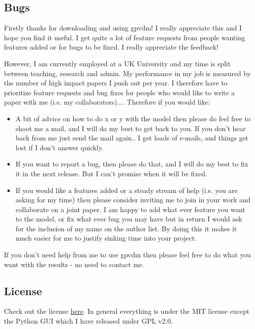 \subsection{Bugs}
Firstly thanks for downloading and using gpvdm! I really appreciate this and I hope you find it useful. I get quite a lot of feature requests from people wanting features added or for bugs to be fixed. I really appreciate the feedback!

However, I am currently employed at a UK University and my time is split between teaching, research and admin. My performance in my job is measured by the number of high impact papers I push out per year. I therefore have to prioritize feature requests and bug fixes for people who would like to write a paper with me (i.e. my collaborators).... Therefore if you would like:

\begin{itemize}
  \item A bit of advice on how to do x or y with the model then please do feel free to shoot me a mail, and I will do my best to get back to you. If you don't hear back from me just send the mail again.. I get loads of e-mails, and things get lost if I don't answer quickly.
  \item If you want to report a bug, then please do that, and I will do my best to fix it in the next release. But I can't promise when it will be fixed.
  \item  If you would like a features added or a steady stream of help (i.e. you are asking for my time) then please consider inviting me to join in your work and collaborate on a joint paper. I am happy to add what ever feature you want to the model, or fix what ever bug you may have but in return I would ask for the inclusion of my name on the author list. By doing this it makes it much easier for me to justify sinking time into your project.
\end{itemize}
    
If you don't need help from me to use gpvdm then please feel free to do what you want with the results - no need to contact me.

\subsection{License}
Check out the license \href{https://github.com/roderickmackenzie/gpvdm/blob/main/LICENSE.md}{here}. In general everything is under the MIT license except the Python GUI which I have released under GPL v2.0.

